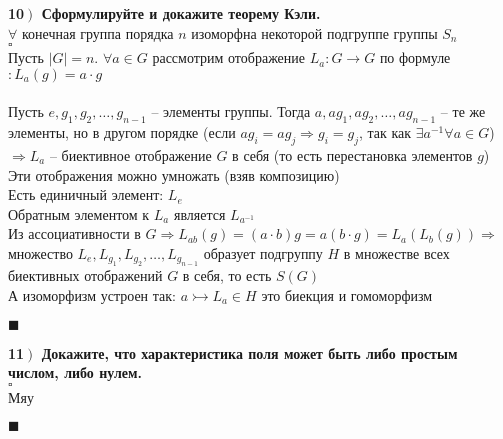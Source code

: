 \documentclass[a4paper,12pt]{article}
\begin{document}
    \textbf{10$\left.\right)$ Сформулируйте и докажите теорему Кэли.}\\$\forall$ конечная группа порядка $n$ изоморфна некоторой подгруппе группы $S_n$\\
    $\square$\\
    Пусть $|G|=n$. $\forall a\in G$ рассмотрим отображение $L_a:G\rightarrow G$ по формуле$:L_a(g)=a\cdot g$\\
    \\
    Пусть $e, g_1, g_2, \ldots, g_{n-1}$ -- элементы группы. Тогда $a, ag_1, ag_2, \ldots, ag_{n-1}$ -- те же элементы, но в другом порядке (если $ag_i=ag_j\Rightarrow g_i=g_j$, так как $\exists a^{-1}\forall a\in G$)\\
    $\Rightarrow L_a$ -- биективное отображение $G$ в себя (то есть перестановка элементов $g$)\\
    Эти отображения можно умножать (взяв композицию)\\
    Есть единичный элемент: $L_e$\\
    Обратным элементом к $L_a$ является $L_{a^{-1}}$\\
    Из ассоциативности в $G\Rightarrow L_{ab}(g)=(a\cdot b)g=a(b\cdot g)=L_a(L_b(g))\Rightarrow$ множество $L_e, L_{g_1}, L_{g_2}, \ldots, L_{g_{n-1}}$ образует подгруппу $H$ в множестве всех биективных отображений $G$  в себя, то есть $S(G)$\\
    А изоморфизм устроен так: $a\rightarrowtail L_a\in H$ это биекция и гомоморфизм
    \begin{flushright}
        $\blacksquare$
    \end{flushright}

    \textbf{11$\left.\right)$ Докажите, что характеристика поля может быть либо простым числом, либо нулем.}\\
    $\square$\\

    Мяу

    \begin{flushright}
        $\blacksquare$
    \end{flushright}
\end{document}
